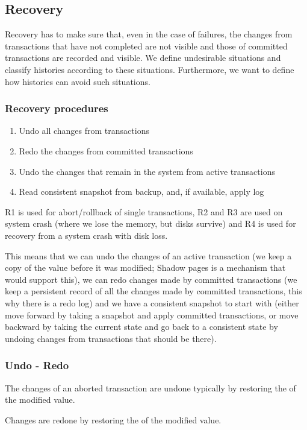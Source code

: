\subsection{Recovery}
Recovery has to make sure that, even in the case of failures, the changes from transactions that have not completed are not visible
and those of committed transactions are recorded and visible.
We define undesirable situations and classify histories according to these situations.
Furthermore, we want to define how histories can avoid such situations.


\subsubsection{Recovery procedures}
\begin{enumerate}[label=R\arabic*]
    \item Undo all changes from transactions
    \item Redo the changes from committed transactions
    \item Undo the changes that remain in the system from active transactions
    \item Read consistent snapshot from backup, and, if available, apply log
\end{enumerate}
R1 is used for abort/rollback of single transactions, R2 and R3 are used on system crash (where we lose the memory, but disks survive)
and R4 is used for recovery from a system crash with disk loss.

This means that we can undo the changes of an active transaction (we keep a copy of the value before it was modified; Shadow pages is a mechanism that would support this),
we can redo changes made by committed transactions (we keep a persistent record of all the changes made by committed transactions, this why there is a redo log)
and we have a consistent snapshot to start with (either move forward by taking a snapshot and apply committed transactions,
or move backward by taking the current state and go back to a consistent state by undoing changes from transactions that should be there).


\subsubsection{Undo - Redo}
The changes of an aborted transaction are undone typically by restoring the  of the modified value.

Changes are redone by restoring the  of the modified value.

